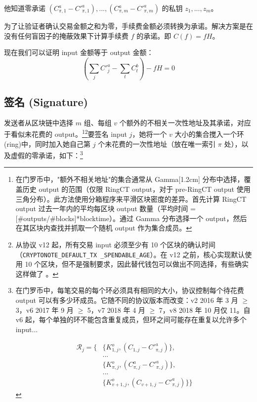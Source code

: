 他知道零承诺 $(C^a_{\pi,1} - C'^a_{\pi,1}),...,(C^a_{\pi,m} - C'^a_{\pi,m})$ 的私钥 $z_1,...,z_m$。

为了让验证者确认交易金额之和为零，手续费金额必须转换为承诺。解决方案是在没有任何盲因子的掩蔽效果下计算手续费 $f$ 的承诺。即 $C(f) = f H$。

现在我们可以证明 input 金额等于 output 金额：\\
\[(\sum_j C'^a_{j} - \sum_t C^b_{t}) - f H = 0\]


\subsection{签名 (Signature)}
\label{full-signature}

发送者从区块链中选择 $m$ 组、每组 $v$ 个额外的不相关一次性地址及其承诺，对应于看似未花费的 output。\footnote{\label{input-selection}在门罗币中，"额外不相关地址"的集合通常从 Gamma[1.2cm] 分布中选择，覆盖历史 output 的范围（仅限 RingCT output，对于 pre-RingCT output 使用三角分布）。此方法使用分箱程序来平滑区块密度的差异。首先计算 RingCT output 过去一年内的平均每区块 output 数量（平均时间 = [\#outputs/\#blocks]*blocktime）。通过 Gamma 分布选择一个 output，然后在其区块内查找并抓取一个随机 output 作为集合成员。\cite{AnalysisOfLinkability}}\footnote{从协议 v12 起，所有交易 input 必须至少有 10 个区块的确认时间（{\tt CRYPTONOTE\_DEFAULT\_TX \_SPENDABLE\_AGE}）。在 v12 之前，核心实现默认使用 10 个区块，但不是强制要求，因此替代钱包可以做出不同选择，有些确实这样做了 \cite{visualizing-monero-vid}。}要签名 input $j$，她将一个 $v$ 大小的集合搅入一个{环 (ring)}中，同时加入她自己第 $j$ 个未花费的一次性地址（放在唯一索引 $\pi$ 处），以及虚假的零承诺，如下：\footnote{在门罗币中，每笔交易的每个环必须具有相同的大小，协议控制每个待花费 output 可以有多少环成员。它随不同的协议版本而改变：v2 2016 年 3 月 $\geq$ 3，v6 2017 年 9 月 $\geq$ 5，v7 2018 年 4 月 $\geq$ 7，v8 2018 年 10 月仅 11。自 v6 起，每个单独的环不能包含重复成员，但环之间可能存在重复以允许多个 input...

\begin{align*}
    \mathcal{R}_j = \{&\{K^o_{1, j}, (C_{1, j} - C'^a_{\pi, j})\}, \\
    &... \\
    &\{ K^o_{\pi, j}, (C^a_{\pi, j} - C'^a_{\pi, j})\}, \\
    &... \\
    &\{ K^o_{v+1, j}, (C_{v+1, j} - C'^a_{\pi, j})\}\}
\end{align*}

}
